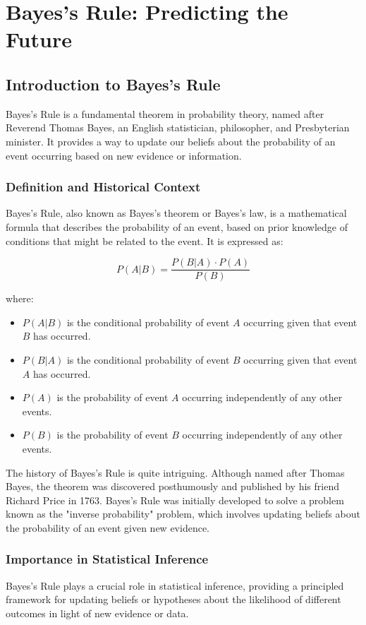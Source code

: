\documentclass[12pt]{book} %
\begin{document}
\chapter{Bayes's Rule: Predicting the Future}

\section{Introduction to Bayes's Rule}
Bayes's Rule is a fundamental theorem in probability theory, named after Reverend Thomas Bayes, an English statistician, philosopher, and Presbyterian minister. It provides a way to update our beliefs about the probability of an event occurring based on new evidence or information.

\subsection{Definition and Historical Context}
Bayes's Rule, also known as Bayes's theorem or Bayes's law, is a mathematical formula that describes the probability of an event, based on prior knowledge of conditions that might be related to the event. It is expressed as:

\[
P(A|B) = \frac{P(B|A) \cdot P(A)}{P(B)}
\]

where:
\begin{itemize}
    \item \(P(A|B)\) is the conditional probability of event \(A\) occurring given that event \(B\) has occurred.
    \item \(P(B|A)\) is the conditional probability of event \(B\) occurring given that event \(A\) has occurred.
    \item \(P(A)\) is the probability of event \(A\) occurring independently of any other events.
    \item \(P(B)\) is the probability of event \(B\) occurring independently of any other events.
\end{itemize}

The history of Bayes's Rule is quite intriguing. Although named after Thomas Bayes, the theorem was discovered posthumously and published by his friend Richard Price in 1763. Bayes's Rule was initially developed to solve a problem known as the "inverse probability" problem, which involves updating beliefs about the probability of an event given new evidence.

\subsection{Importance in Statistical Inference}
Bayes's Rule plays a crucial role in statistical inference, providing a principled framework for updating beliefs or hypotheses about the likelihood of different outcomes in light of new evidence or data. 
\end{document}
